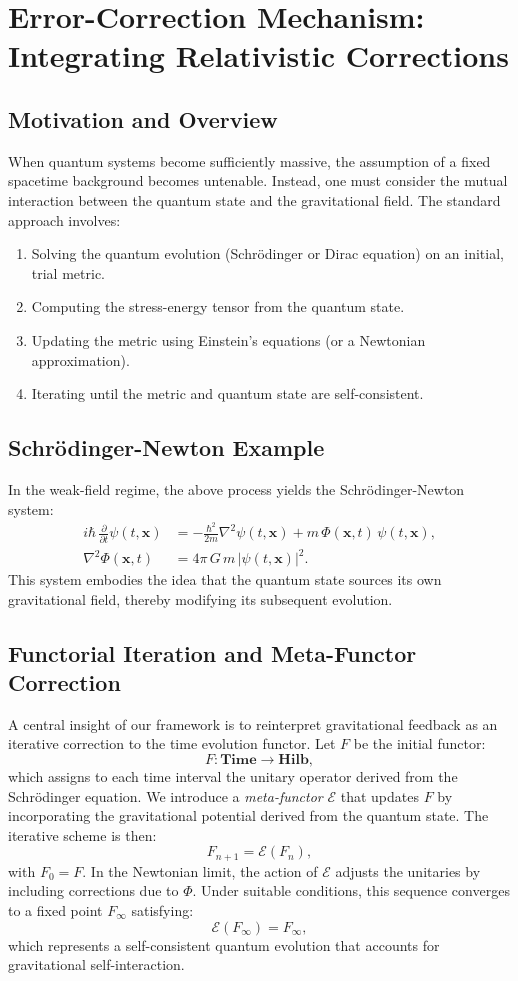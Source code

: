 \documentclass[12pt]{article}
\begin{document}
\section{Error-Correction Mechanism: Integrating Relativistic Corrections}
\subsection{Motivation and Overview}
When quantum systems become sufficiently massive, the assumption of a fixed spacetime background becomes untenable. Instead, one must consider the mutual interaction between the quantum state and the gravitational field. The standard approach involves:
\begin{enumerate}
    \item Solving the quantum evolution (Schrödinger or Dirac equation) on an initial, trial metric.
    \item Computing the stress-energy tensor from the quantum state.
    \item Updating the metric using Einstein's equations (or a Newtonian approximation).
    \item Iterating until the metric and quantum state are self-consistent.
\end{enumerate}

\subsection{Schrödinger-Newton Example}
In the weak-field regime, the above process yields the Schrödinger-Newton system:
\begin{align}
i\hbar\,\frac{\partial}{\partial t}\psi(t,\mathbf{x}) &= -\frac{\hbar^2}{2m}\nabla^2\psi(t,\mathbf{x})+m\,\Phi(\mathbf{x},t)\,\psi(t,\mathbf{x}),\\[1mm]
\nabla^2\Phi(\mathbf{x},t) &= 4\pi\,G\,m\,|\psi(t,\mathbf{x})|^2.
\end{align}
This system embodies the idea that the quantum state sources its own gravitational field, thereby modifying its subsequent evolution.

\subsection{Functorial Iteration and Meta-Functor Correction}
A central insight of our framework is to reinterpret gravitational feedback as an iterative correction to the time evolution functor. Let \(F\) be the initial functor:
\[
F: \mathbf{Time} \to \mathbf{Hilb},
\]
which assigns to each time interval the unitary operator derived from the Schrödinger equation. We introduce a \emph{meta-functor} \(\mathcal{E}\) that updates \(F\) by incorporating the gravitational potential derived from the quantum state. The iterative scheme is then:
\[
F_{n+1} = \mathcal{E}(F_n),
\]
with \(F_0 = F\). In the Newtonian limit, the action of \(\mathcal{E}\) adjusts the unitaries by including corrections due to \(\Phi\). Under suitable conditions, this sequence converges to a fixed point \(F_\infty\) satisfying:
\[
\mathcal{E}(F_\infty) = F_\infty,
\]
which represents a self-consistent quantum evolution that accounts for gravitational self-interaction.
\end{document}
